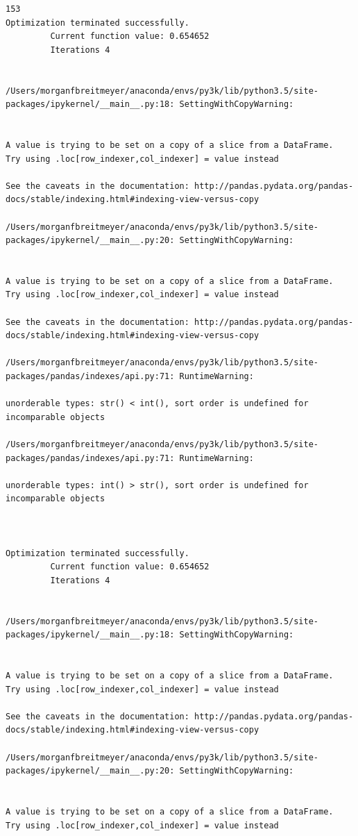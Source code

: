 \begin{lstlisting}
153
Optimization terminated successfully.
         Current function value: 0.654652
         Iterations 4


/Users/morganfbreitmeyer/anaconda/envs/py3k/lib/python3.5/site-packages/ipykernel/__main__.py:18: SettingWithCopyWarning:


A value is trying to be set on a copy of a slice from a DataFrame.
Try using .loc[row_indexer,col_indexer] = value instead

See the caveats in the documentation: http://pandas.pydata.org/pandas-docs/stable/indexing.html#indexing-view-versus-copy

/Users/morganfbreitmeyer/anaconda/envs/py3k/lib/python3.5/site-packages/ipykernel/__main__.py:20: SettingWithCopyWarning:


A value is trying to be set on a copy of a slice from a DataFrame.
Try using .loc[row_indexer,col_indexer] = value instead

See the caveats in the documentation: http://pandas.pydata.org/pandas-docs/stable/indexing.html#indexing-view-versus-copy

/Users/morganfbreitmeyer/anaconda/envs/py3k/lib/python3.5/site-packages/pandas/indexes/api.py:71: RuntimeWarning:

unorderable types: str() < int(), sort order is undefined for incomparable objects

/Users/morganfbreitmeyer/anaconda/envs/py3k/lib/python3.5/site-packages/pandas/indexes/api.py:71: RuntimeWarning:

unorderable types: int() > str(), sort order is undefined for incomparable objects



Optimization terminated successfully.
         Current function value: 0.654652
         Iterations 4


/Users/morganfbreitmeyer/anaconda/envs/py3k/lib/python3.5/site-packages/ipykernel/__main__.py:18: SettingWithCopyWarning:


A value is trying to be set on a copy of a slice from a DataFrame.
Try using .loc[row_indexer,col_indexer] = value instead

See the caveats in the documentation: http://pandas.pydata.org/pandas-docs/stable/indexing.html#indexing-view-versus-copy

/Users/morganfbreitmeyer/anaconda/envs/py3k/lib/python3.5/site-packages/ipykernel/__main__.py:20: SettingWithCopyWarning:


A value is trying to be set on a copy of a slice from a DataFrame.
Try using .loc[row_indexer,col_indexer] = value instead


\end{lstlisting}
